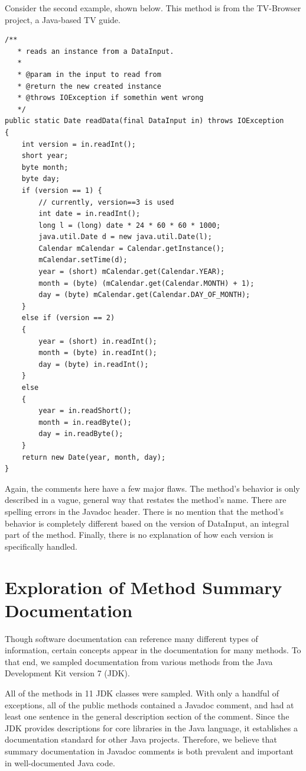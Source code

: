 \documentclass[preprint]{sigplanconf}
\begin{document}
Consider the second example, shown below. This method is from the TV-Browser project, a Java-based TV guide.

\begin{lstlisting}
/**
   * reads an instance from a DataInput.
   *
   * @param in the input to read from
   * @return the new created instance
   * @throws IOException if somethin went wrong
   */
public static Date readData(final DataInput in) throws IOException
{
    int version = in.readInt();
    short year;
    byte month;
    byte day;
    if (version == 1) {
        // currently, version==3 is used
        int date = in.readInt();
        long l = (long) date * 24 * 60 * 60 * 1000;
        java.util.Date d = new java.util.Date(l);
        Calendar mCalendar = Calendar.getInstance();
        mCalendar.setTime(d);
        year = (short) mCalendar.get(Calendar.YEAR);
        month = (byte) (mCalendar.get(Calendar.MONTH) + 1);
        day = (byte) mCalendar.get(Calendar.DAY_OF_MONTH);
    }
    else if (version == 2)
    {
        year = (short) in.readInt();
        month = (byte) in.readInt();
        day = (byte) in.readInt();
    }
    else
    {
        year = in.readShort();
        month = in.readByte();
        day = in.readByte();
    }
    return new Date(year, month, day);
}
\end{lstlisting}

Again, the comments here have a few major flaws. The method's behavior is only described in a vague, general way that restates the method's name. There are spelling errors in the Javadoc header. There is no mention that the method's behavior is completely different based on the version of DataInput, an integral part of the method. Finally, there is no explanation of how each version is specifically handled.

\section{Exploration of Method Summary Documentation}
Though software documentation can reference many different types of information, certain concepts appear in the documentation for many methods. To that end, we sampled documentation from various methods from the Java Development Kit version 7 (JDK).

All of the methods in 11 JDK classes were sampled. With only a handful of exceptions, all of the public methods contained a Javadoc comment, and had at least one sentence in the general description section of the comment. Since the JDK provides descriptions for core libraries in the Java language, it establishes a documentation standard for other Java projects. Therefore, we believe that summary documentation in Javadoc comments is both prevalent and important in well-documented Java code.
\end{document}
